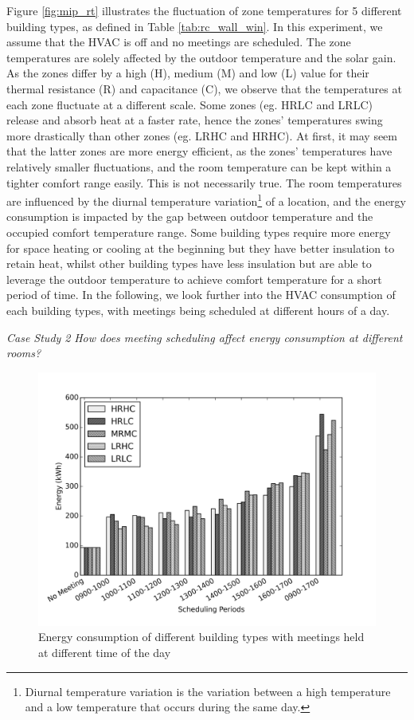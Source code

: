 Figure \ref{fig:mip_rt} illustrates the fluctuation of zone temperatures for 5 different building types, as defined in Table \ref{tab:rc_wall_win}. In this experiment, we assume that the HVAC is off and no meetings are scheduled. The zone temperatures are solely affected by the outdoor temperature and the solar gain.  As the zones differ by a high (H), medium (M) and low (L) value for their thermal resistance (R) and capacitance (C), we observe that the temperatures at each zone fluctuate at a different scale. Some zones (eg. HRLC and LRLC) release and absorb heat at a faster rate, hence the zones' temperatures swing more drastically than other zones (eg. LRHC and HRHC). %
At first, it may seem that the latter zones are more energy efficient, as the zones' temperatures have relatively smaller fluctuations, and the room temperature can be kept within a tighter comfort range easily.
This is not necessarily true. The room temperatures are influenced by the diurnal temperature variation\footnote{Diurnal temperature variation is the variation between a high temperature and a low temperature that occurs during the same day.} of a location, and the energy consumption is impacted by the gap between outdoor temperature and the occupied comfort temperature range. Some building types require more energy for space heating or cooling at the beginning but they have better insulation to retain heat, whilst other building types have less insulation but are able to leverage the outdoor temperature to achieve comfort temperature for a short period of time. %
In the following, we look further into the HVAC consumption of each building types, with meetings being scheduled at different hours of a day.

\vspace{10px}
\emph{Case Study 2} \quad \textsl{How does meeting scheduling affect energy consumption at different rooms?}
\vspace{10px}

\begin{figure}
	\centering
		\includegraphics[width=0.74\linewidth,keepaspectratio]{./figs/mip_room_energy.png}		
	\caption{Energy consumption of different building types with meetings held at different time of the day}
	\label{fig:mip_re}
\end{figure}

